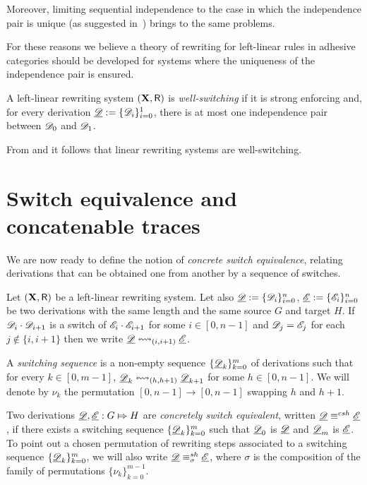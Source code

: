 Moreover, limiting sequential independence to the case in which the independence pair is unique (as suggested in~\cite{baldan2017domains}) brings to the same problems.

For these reasons we believe a theory of rewriting for
left-linear rules in adhesive categories should be developed for
systems where the uniqueness of the independence pair is ensured.

\begin{definition}
	A left-linear rewriting system $(\textbf {\textup{X}}, \mathsf{R})$ is \emph{well-switching} if it is strong enforcing and, for every derivation $\underline{\mathscr{D}}:=\{\mathscr{D}_{i}\}_{i=0}^1$, there is at most one independence pair between $\mathscr{D}_0$ and $\mathscr{D}_1$.
\end{definition}


\begin{remark}
	From  and  it follows that linear rewriting systems are well-switching.
\end{remark}




\section{Switch equivalence and concatenable traces}

We are now ready to define the notion of \emph{concrete switch equivalence}, relating derivations that 
can be obtained one from another by a sequence of switches. 

\begin{definition}
	\label{de:switch-equivalence}
	Let $(\textbf {\textup{X}}, \mathsf{R})$ be a left-linear rewriting system.  Let also  $\underline{\mathscr{D}}:=\{\mathscr{D}_{i}\}_{i=0}^n$,  	$\underline{\mathscr{E}}:=\{\mathscr{E}_{i}\}_{i=0}^n$
	be two derivations with the same length and the same
	source $G$ and  target $H$. 	If $\mathscr{D}_i \cdot \mathscr{D}_{i+1}$ is a switch of
	$\mathscr{E}_i \cdot \mathscr{E}_{i+1}$ for some $i \in [0,n-1]$ and  $\mathscr{D}_j = \mathscr{E}_j$ for each $j \not \in \{i,i+1\}$ then we write
	$\der{D} \shift{\transp{i}} \der{E}$.
	 
	A \emph{switching sequence} is a non-empty sequence $\{\underline{\mathscr{D}}_{k}\}_{k=0}^m$
	of derivations such that for every $k\in [0,m-1]$, $\der{D}_k \shift{\transp{h}}\der{D}_{k+1}$ for some $h\in [0, n-1]$. We will denote by $\nu_{k}$ the permutation $[0,n-1]\to [0,n-1] $ swapping $h$ and $h+1$.
	
	Two derivations $\underline{\mathscr{D}}, \underline{\mathscr{E}}:G\Mapsto H$ are \emph{concretely switch
		equivalent}, written $\underline{\mathscr{D}}\equiv^{csh} \underline{\mathscr{E}}$, if there exists a
	switching sequence $\{\underline{\mathscr{D}}_{k}\}_{k=0}^m$ such that $\underline{\mathscr{D}}_0$ is $\underline{\mathscr{D}}$ and $\underline{\mathscr{D}}_m$ is $\underline{\mathscr{E}}$. To point out a chosen permutation of rewriting steps associated to a switching sequence $\{\underline{\mathscr{D}}_k\}_{k=0}^m$, we will also write $\underline{\mathscr{D}}\equiv^{sh}_{\sigma} \underline{\mathscr{E}}$, 
	where $\sigma$ is the composition of the family of permutations $\{\nu_k\}_{k=0}^{m-1}$. 
\end{definition}

